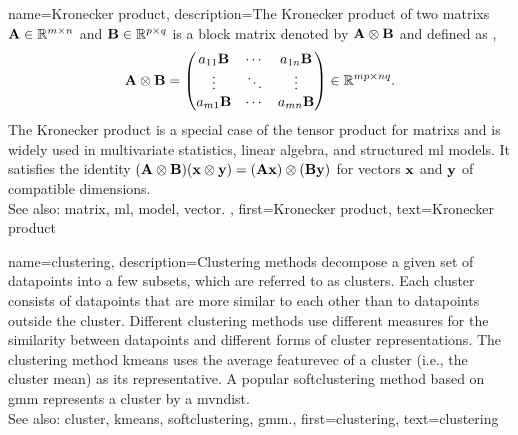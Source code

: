 {name={Kronecker product}, 
	description={The Kronecker product of two \glspl{matrix} ${\bf A} \in \mathbb{R}^{m \times n}$ 
		and ${\bf B} \in \mathbb{R}^{p \times q}$ is a block \gls{matrix} denoted by ${\bf A} \otimes {\bf B}$ 
	 	and defined as \cite{GolubVanLoanBook}, \cite{HornMatAnalysis}
    		\[
      		{\bf A} \otimes {\bf B} =
      		\begin{pmatrix}
        		a_{11}{\bf B} & \cdots & a_{1n}{\bf B} \\
        		\vdots & \ddots & \vdots \\
        		a_{m1}{\bf B} & \cdots & a_{mn}{\bf B}
      		\end{pmatrix}
      		\in \mathbb{R}^{mp \times nq}.
    		\]
    		The Kronecker product is a special case of the tensor product for \glspl{matrix} and is 
		widely used in multivariate statistics, linear algebra, and structured \gls{ml} \glspl{model}. 
		It satisfies the identity $({\bf A} \otimes {\bf B})({\bf x} \otimes {\bf y}) = ({\bf A}{\bf x}) \otimes ({\bf B}{\bf y})$ 
		for \glspl{vector} ${\bf x}$ and ${\bf y}$ of compatible dimensions.
		\\
		See also: \gls{matrix}, \gls{ml}, \gls{model}, \gls{vector}. },
	first={Kronecker product},
	text={Kronecker product} 
}
	
{name={clustering}, 
	description={Clustering methods decompose a given 
		set of \glspl{datapoint} into a few subsets, which are referred to as \glspl{cluster}. 
		Each \gls{cluster} consists of \glspl{datapoint} that are more similar to each 
		other than to \glspl{datapoint} outside the \gls{cluster}. Different clustering methods 
		use different \glspl{measure} for the similarity between \glspl{datapoint} and different 
		forms of \gls{cluster} representations. The clustering method \gls{kmeans} uses the 
		average \gls{featurevec} of a \gls{cluster} (i.e., the \gls{cluster} \gls{mean}) as its representative. 
		A popular \gls{softclustering} method based on \gls{gmm} represents 
		a \gls{cluster} by a \gls{mvndist}.
				\\
		See also: \gls{cluster}, \gls{kmeans}, \gls{softclustering}, \gls{gmm}.},
	first={clustering},
	text={clustering} 
}
	
